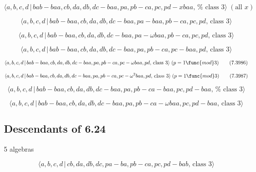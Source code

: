\documentclass[10pt]{article}
\begin{document}
\begin{equation}
\langle a,b,c,d\,|\,bab-baa,cb,da,db,dc-baa,pa,pb-ca,pc,pd-xbaa,\,\text{%
class }3\rangle \;(\text{all }x)  \tag{7.3982}
\end{equation}

\begin{equation}
\langle a,b,c,d\,|\,bab-baa,cb,da,db,dc-baa,pa-baa,pb-ca,pc,pd,\,\text{class 
}3\rangle  \tag{7.3983}
\end{equation}

\begin{equation}
\langle a,b,c,d\,|\,bab-baa,cb,da,db,dc-baa,pa-\omega baa,pb-ca,pc,pd,\,%
\text{class }3\rangle  \tag{7.3984}
\end{equation}

\begin{equation}
\langle a,b,c,d\,|\,bab-baa,cb,da,db,dc-baa,pa,pb-ca,pc-baa,pd,\,\text{class 
}3\rangle  \tag{7.3985}
\end{equation}

\begin{equation}
\langle a,b,c,d\,|\,bab-baa,cb,da,db,dc-baa,pa,pb-ca,pc-\omega baa,pd,\,%
\text{class }3\rangle \;(p=1\func{mod}3)  \tag{7.3986}
\end{equation}

\begin{equation}
\langle a,b,c,d\,|\,bab-baa,cb,da,db,dc-baa,pa,pb-ca,pc-\omega ^{2}baa,pd,\,%
\text{class }3\rangle \;(p=1\func{mod}3)  \tag{7.3987}
\end{equation}

\begin{equation}
\langle a,b,c,d\,|\,bab-baa,cb,da,db,dc-baa,pa,pb-ca-baa,pc,pd-baa,\,\text{%
class }3\rangle  \tag{7.3988}
\end{equation}

\begin{equation}
\langle a,b,c,d\,|\,bab-baa,cb,da,db,dc-baa,pa,pb-ca-\omega baa,pc,pd-baa,\,%
\text{class }3\rangle  \tag{7.3989}
\end{equation}

\subsection{Descendants of 6.24}

5 algebras

\begin{equation}
\langle a,b,c,d\,|\,cb,da,db,dc,pa-ba,pb-ca,pc,pd-bab,\,\text{class }3\rangle
\tag{7.3990}
\end{equation}
\end{document}
